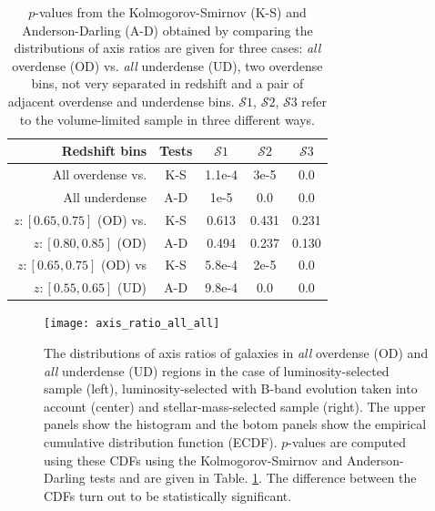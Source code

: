 \documentclass[twocolumn,useAMS,usenatbib]{mn2e}
\newcommand{\s}{\ensuremath{\mathcal{S}}}
\begin{document}
\begin{table}
 \centering
 \begin{tabular}[\columnwidth]{ | r | c | c | c | c | }
  \hline
  Redshift bins & Tests & \s$1$ & \s$2$ & \s$3$ \\
  \hline
  All overdense vs. & K-S & 1.1e-4 & 3e-5 & 0.0 \\
  All underdense    & A-D & 1e-5 & 0.0 & 0.0 \\ \hline 
  $z:[0.65,0.75]$ (OD) vs. & K-S & 0.613 & 0.431 & 0.231 \\
  $z:[0.80,0.85]$ (OD) & A-D & 0.494 & 0.237 & 0.130 \\ \hline
  $z:[0.65,0.75]$ (OD) vs & K-S & 5.8e-4 & 2e-5 & 0.0 \\
  $z:[0.55,0.65]$ (UD) & A-D & 9.8e-4 & 0.0 & 0.0 \\ \hline
 \end{tabular}
 \caption{$p$-values from the Kolmogorov-Smirnov (K-S) and Anderson-Darling (A-D) obtained by comparing the distributions of axis ratios are given for three cases: \emph{all} overdense (OD) vs. \emph{all} underdense (UD), two overdense bins, not very separated in redshift and a pair of adjacent overdense and underdense bins. \s$1$, \s$2$, \s$3$ refer to the volume-limited sample in three different ways.}
 \label{table:pvalues_all}
\end{table}

\begin{figure}
 \centering
 \texttt{[image: axis\_ratio\_all\_all]}
 \caption{The distributions of axis ratios of galaxies in \emph{all} overdense (OD) and \emph{all} underdense (UD) regions in the case of luminosity-selected sample (left), luminosity-selected with B-band evolution taken into account (center) and stellar-mass-selected sample (right). The upper panels show the histogram
 and the botom panels show the empirical cumulative distribution function (ECDF). $p$-values are computed using these CDFs using the Kolmogorov-Smirnov and Anderson-Darling tests and are given in Table. \ref{table:pvalues_all}. The difference between the CDFs turn out to be statistically significant.}
 \label{fig:axisratio_all}
\end{figure}
\end{document}
